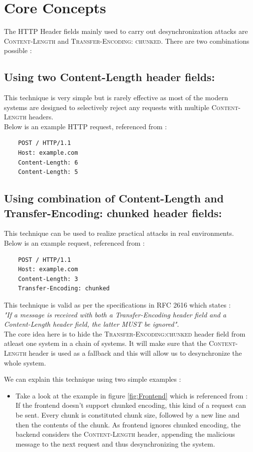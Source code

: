 \chapter{Core Concepts}
The HTTP Header fields mainly used to carry out desynchronization attacks are \textsc{Content-Length} and \textsc{Transfer-Encoding: chunked}. There are two combinations possible : 
\section{Using two Content-Length header fields:}
	This technique is very simple but is rarely effective as most of the modern systems are designed to selectively reject any requests with multiple \textsc{Content-Length} headers.\\
	Below is an example HTTP request, referenced from \cite{b6}:
	\begin{verbatim}
	POST / HTTP/1.1
	Host: example.com
	Content-Length: 6
	Content-Length: 5
	\end{verbatim}
\section{Using combination of Content-Length and Transfer-Encoding: chunked header fields:}This technique can be used to realize practical attacks in real environments. 
	Below is an example request, referenced from \cite{b6}:
	\begin{verbatim}
	POST / HTTP/1.1
	Host: example.com
	Content-Length: 3
	Transfer-Encoding: chunked
	\end{verbatim}
	This technique is valid as per the specifications in RFC 2616\cite{b10} which states : \\
	\textit{"If a message is received with both a Transfer-Encoding header field and a Content-Length header field, the latter MUST be ignored".}\\
	The core idea here is to hide the \textsc{Transfer-Encoding:chunked} header field from atleast one system in a chain of systems. It will make sure that the \textsc{Content-Length} header is used as a fallback and this will allow us to desynchronize the whole system.

We can explain this technique using two simple examples : 
\begin{itemize}
	\item Take a look at the example in figure \ref{fig:Frontend} which is referenced from \cite{b6}:
	If the frontend doesn't support chunked encoding, this kind of a request can be sent. Every chunk is constituted chunk size, followed by a new line and then the contents of the chunk. As frontend ignores chunked encoding, the backend considers the \textsc{Content-Length} header, appending the malicious message to the next request and thus desynchronizing the system.
\end{itemize}

